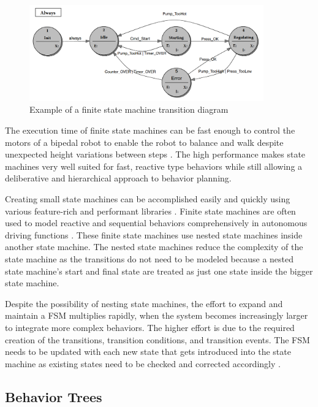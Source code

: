 \begin{figure}[ht]
	\centering
	\includegraphics[width=0.9\textwidth]{images/fsm.png} 
	\caption{Example of a finite state machine transition diagram \cite{wagner2006}}
	\label{fig:fsm}
\end{figure}

The execution time of finite state machines can be fast enough to control the motors of a bipedal robot to enable the robot to balance and walk despite unexpected height variations between steps \cite{park2013}. The high performance makes state machines very well suited for fast, reactive type behaviors while still allowing a deliberative and hierarchical approach to behavior planning.

Creating small state machines can be accomplished easily and quickly using various feature-rich and performant libraries \cite{fourakis2014}. Finite state machines are often used to model reactive and sequential behaviors comprehensively in autonomous driving functions \cite{ziegler2014}. These finite state machines use nested state machines inside another state machine. The nested state machines reduce the complexity of the state machine as the transitions do not need to be modeled because a nested state machine's start and final state are treated as just one state inside the bigger state machine. 

Despite the possibility of nesting state machines, the effort to expand and maintain a FSM multiplies rapidly, when the system becomes increasingly larger to integrate more complex behaviors. The higher effort is due to the required creation of the transitions, transition conditions, and transition events. The FSM needs to be updated with each new state that gets introduced into the state machine as existing states need to be checked and corrected accordingly \cite{conner2017}. 
%

\subsection{Behavior Trees}
\label{subsec:Behavior Trees}

